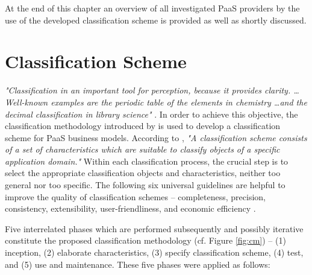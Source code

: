 At the end of this chapter an overview of all investigated \ac{PaaS} providers by the use of the developed classification scheme is provided as well as shortly discussed.

\section{Classification Scheme}\label{ch:sota:cm}

\textit{"Classification in an important tool for perception, because it provides clarity. \ldots Well-known examples are the periodic table of the elements in chemistry \ldots and the decimal classification in library science"} \citep[p. 36]{Fettke2003}. In order to achieve this objective, the classification methodology introduced by \citet{Fettke2003} is used to develop a classification scheme for \ac{PaaS} business models. According to \citet[p. 39]{Fettke2003}, \textit{"A classification scheme consists of a set of characteristics which are suitable to classify objects of a specific application domain."} Within each classification process, the crucial step is to select the appropriate classification objects and characteristics, neither too general nor too specific. The following six universal guidelines are helpful to improve the quality of classification schemes -- completeness, precision, consistency, extensibility, user-friendliness, and economic efficiency \citep[pp. 40-41]{Fettke2003}. 

Five interrelated phases which are performed subsequently and possibly iterative constitute the proposed classification methodology (cf. Figure \ref{fig:cm}) -- (1) inception, (2) elaborate characteristics, (3) specify classification scheme, (4) test, and (5) use and maintenance. These five phases were applied as follows:

